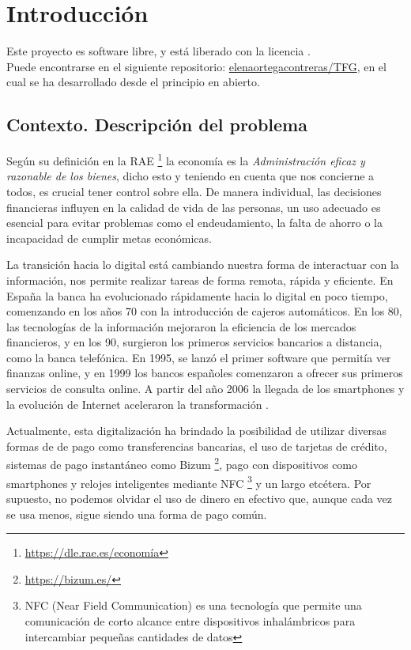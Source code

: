 \chapter{Introducción}
Este proyecto es software libre, y está liberado con la licencia \cite{gplv3}.\\

Puede encontrarse en el siguiente repositorio:
\href{https://github.com/elenaortegacontreras/TFG}{elenaortegacontreras/TFG}, 
en el cual se ha desarrollado desde el principio en abierto.

\section{Contexto. Descripción del problema}

Según su definición en la RAE \footnote{\url{https://dle.rae.es/economía}} la economía es la 
\textit{Administración eficaz y razonable de los bienes}, dicho esto y teniendo en 
cuenta que nos concierne a todos, es crucial tener control sobre ella. 
De manera individual, las decisiones financieras influyen en la calidad de vida de las personas,
un uso adecuado es esencial para evitar problemas como el endeudamiento, la 
falta de ahorro o la incapacidad de cumplir metas económicas.

La transición hacia lo digital está cambiando nuestra forma de interactuar con 
la información, nos permite realizar tareas de forma remota, rápida y eficiente. 
En España la banca ha evolucionado rápidamente hacia lo digital en poco tiempo, comenzando en los años 70 con la introducción de cajeros automáticos. En los 80, las tecnologías de la información mejoraron la eficiencia de los mercados financieros, y en los 90, surgieron los primeros servicios bancarios a distancia, como la banca telefónica. En 1995, se lanzó el primer software que permitía ver finanzas online, y en 1999 los bancos españoles comenzaron a ofrecer  sus primeros servicios de consulta online. A partir del año 2006 la llegada de los smartphones y la evolución de Internet aceleraron la transformación \cite{hebrero2022fintech}.

Actualmente, esta digitalización ha brindado la posibilidad de utilizar diversas formas de de pago como transferencias bancarias, el uso de tarjetas de crédito, sistemas de pago instantáneo como Bizum \footnote{\url{https://bizum.es/}}, pago con dispositivos como smartphones y relojes inteligentes mediante NFC \footnote{NFC (Near Field Communication) es una tecnología que permite una comunicación de corto alcance entre dispositivos inhalámbricos para intercambiar pequeñas cantidades de datos} y un largo etcétera. Por supuesto, no podemos olvidar el uso de dinero en efectivo que, aunque cada vez se usa menos, sigue siendo una forma de pago común. 

